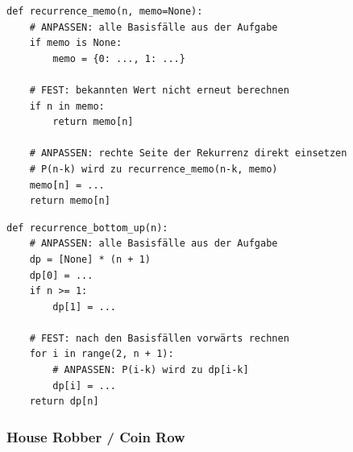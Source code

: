 \begin{codebox}
\begin{lstlisting}[style=CodeExpert]
def recurrence_memo(n, memo=None):
    # ANPASSEN: alle Basisfälle aus der Aufgabe
    if memo is None:
        memo = {0: ..., 1: ...}

    # FEST: bekannten Wert nicht erneut berechnen
    if n in memo:
        return memo[n]

    # ANPASSEN: rechte Seite der Rekurrenz direkt einsetzen
    # P(n-k) wird zu recurrence_memo(n-k, memo)
    memo[n] = ...
    return memo[n]
\end{lstlisting}
\end{codebox}

\begin{contentbox}
\begin{factlist}
\end{factlist}
\end{contentbox}

\begin{codebox}
\begin{lstlisting}[style=CodeExpert]
def recurrence_bottom_up(n):
    # ANPASSEN: alle Basisfälle aus der Aufgabe
    dp = [None] * (n + 1)
    dp[0] = ...
    if n >= 1:
        dp[1] = ...

    # FEST: nach den Basisfällen vorwärts rechnen
    for i in range(2, n + 1):
        # ANPASSEN: P(i-k) wird zu dp[i-k]
        dp[i] = ...
    return dp[n]
\end{lstlisting}
\end{codebox}

\subsubsection{House Robber / Coin Row}\label{sec:03-house-robber}

\begin{contentbox}
\begin{factlist}
\end{factlist}
\end{contentbox}

